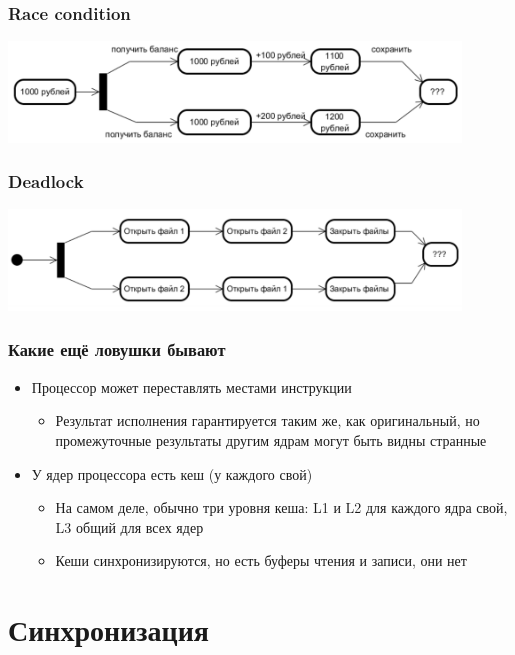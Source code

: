 \documentclass[xetex,mathserif,serif]{beamer}
\begin{document}
	\begin{frame}
		\frametitle{Race condition}
		\begin{center}
			\includegraphics[width=0.9\textwidth]{raceCondition.png}
		\end{center}
	\end{frame}

	\begin{frame}
		\frametitle{Deadlock}
		\begin{center}
			\includegraphics[width=0.9\textwidth]{deadlock.png}
		\end{center}
	\end{frame}

	\begin{frame}
		\frametitle{Какие ещё ловушки бывают}
		\begin{itemize}
			\item Процессор может переставлять местами инструкции
			\begin{itemize}
				\item Результат исполнения гарантируется таким же, как оригинальный, но промежуточные результаты другим 
					ядрам могут быть видны странные
			\end{itemize}
			\item У ядер процессора есть кеш (у каждого свой)
			\begin{itemize}
				\item На самом деле, обычно три уровня кеша: L1 и L2 для каждого ядра свой, L3 общий для всех ядер
				\item Кеши синхронизируются, но есть буферы чтения и записи, они нет
			\end{itemize}
		\end{itemize}
	\end{frame}

	\section{Синхронизация}
\end{document}
